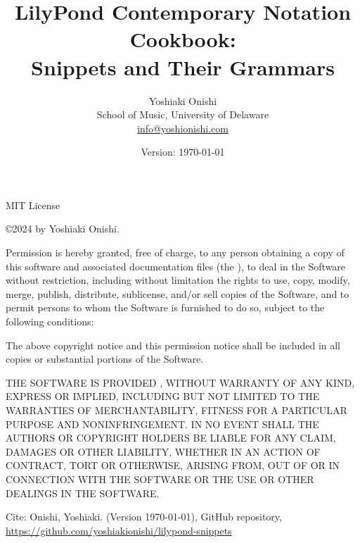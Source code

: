 \documentclass[11pt, oneside]{book}   	%
\title{LilyPond Contemporary Notation Cookbook: \\ Snippets and Their Grammars}
\author{Yoshiaki Onishi\\School of Music, University of Delaware \\ \href{mailto:info@yoshionishi.com}{info@yoshionishi.com}}
\date{Version: \today}
\begin{document}
\maketitle


MIT License

\copyright 2024 by Yoshiaki Onishi. 

Permission is hereby granted, free of charge, to any person obtaining a copy of this software and associated documentation files (the ), to deal in the Software without restriction, including without limitation the rights to use, copy, modify, merge, publish, distribute, sublicense, and/or sell copies of the Software, and to permit persons to whom the Software is furnished to do so, subject to the following conditions:

The above copyright notice and this permission notice shall be included in all copies or substantial portions of the Software.

THE SOFTWARE IS PROVIDED , WITHOUT WARRANTY OF ANY KIND, EXPRESS OR IMPLIED, INCLUDING BUT NOT LIMITED TO THE WARRANTIES OF MERCHANTABILITY, FITNESS FOR A PARTICULAR PURPOSE AND NONINFRINGEMENT. IN NO EVENT SHALL THE AUTHORS OR COPYRIGHT HOLDERS BE LIABLE FOR ANY CLAIM, DAMAGES OR OTHER LIABILITY, WHETHER IN AN ACTION OF CONTRACT, TORT OR OTHERWISE, ARISING FROM, OUT OF OR IN CONNECTION WITH THE SOFTWARE OR THE USE OR OTHER DEALINGS IN THE SOFTWARE.

\hfill \break
Cite: Onishi, Yoshiaki.  (Version \today), GitHub repository, \href{https://github.com/yoshiakionishi/lilypond-snippets}{https://github.com/yoshiakionishi/lilypond-snippets} %


\frontmatter
\tableofcontents
\label{sec:toc}





\mainmatter










\end{document}
